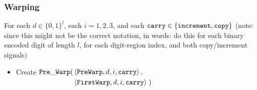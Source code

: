     \subsubsection{ Warping }

        For each $d \in \{0, 1\}^l$, each $i = 1, 2, 3$, and each ${\tt carry} \in \{ {\tt increment, copy } \}$
        (note: since this might not be the correct notation, in words: do this for each binary encoded digit of length $l$,
        for each digit-region index, and both copy/increment signals)

        \begin{itemize}

            \item Create
            $\begin{aligned}[t]
                {\tt Pre\_Warp}(& \left\langle {\tt PreWarp}, d, i, {\tt carry} \right\rangle, \\
                         & \left\langle {\tt FirstWarp}, d, i, {\tt carry} \right\rangle \;)
            \end{aligned}$
            \vspace{.5cm}



\end{itemize}
